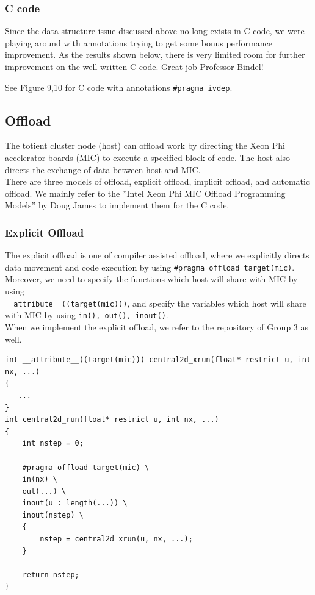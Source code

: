\documentclass[12pt]{article}
\numberwithin{equation}{section}
\begin{document}
\subsubsection{C code}
Since the data structure issue discussed above no long exists in C code, we were
playing around with annotations trying to get some bonus performance improvement.
As the results shown below, there is very limited room for further improvement
on the well-written C code. Great job Professor Bindel!

See Figure 9,10 for C code with annotations \texttt{\#pragma ivdep}.

\subsection{Offload}

The totient cluster node (host) can offload work by directing the Xeon Phi accelerator boards (MIC) to execute a specified block of code. The host also directs the exchange of data between host and MIC.
\\
There are three models of offload, explicit offload, implicit offload, and automatic offload. We mainly refer to the ''Intel Xeon Phi MIC Offload Programming Models'' by Doug James to implement them for the C code.

\subsubsection{Explicit Offload}

The explicit offload is one of compiler assisted offload, where we explicitly directs data movement and code execution by using \texttt{\#pragma offload target(mic)}.
\\
Moreover, we need to specify the functions which host will share with MIC by using \\ \texttt{\_\_attribute\_\_((target(mic)))}, and specify the variables which host will share with MIC by using \texttt{in(), out(), inout()}.
\\
When we implement the explicit offload, we refer to the repository of Group 3 as well.

\scriptsize
\begin{lstlisting}
int __attribute__((target(mic))) central2d_xrun(float* restrict u, int nx, ...)
{
   ...
}
int central2d_run(float* restrict u, int nx, ...)
{
    int nstep = 0;

    #pragma offload target(mic) \
    in(nx) \
    out(...) \
    inout(u : length(...)) \
    inout(nstep) \
    {
        nstep = central2d_xrun(u, nx, ...);
    }

    return nstep;
}
\end{lstlisting}
\end{document}
